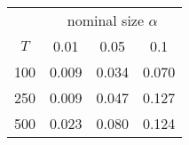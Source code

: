 % 
\begin{tabular}{cccc}
  \hline
  & \multicolumn{3}{c}{nominal size $\alpha$} \\
 $T$ & 0.01 & 0.05 & 0.1 \\
 \hline
100 & 0.009 & 0.034 & 0.070 \\ 
  250 & 0.009 & 0.047 & 0.127 \\ 
  500 & 0.023 & 0.080 & 0.124 \\ 
   \hline
\end{tabular}

